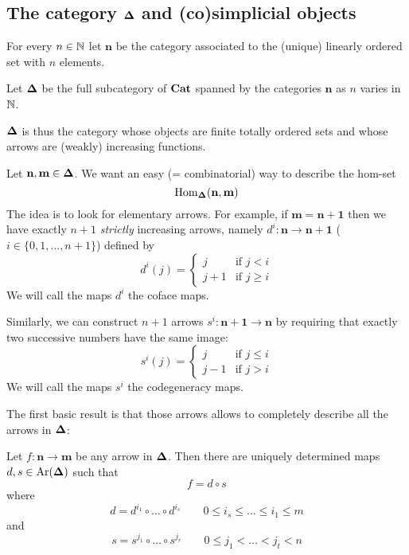 \begin{refsection}
\section{The category $\mathbf \Delta$ and (co)simplicial objects}

\begin{notation}
For every $n \in \mathbb{N}$ let $\mathbf n$ be the category associated to the (unique) linearly ordered set with $n$ elements.
\end{notation}

\begin{defin}
Let $\mathbf \Delta$ be the full subcategory of $\mathbf{Cat}$ spanned by the categories $\mathbf n$ as $n$ varies in $\mathbb{N}$.
\end{defin}

\begin{rmk}
$\mathbf \Delta$ is thus the category whose objects are finite totally ordered sets and whose arrows are (weakly) increasing functions.
\end{rmk}

Let $\mathbf n, \mathbf m \in \mathbf \Delta$. We want an easy (= combinatorial) way to describe the hom-set
\[
\mathrm{Hom}_{\mathbf \Delta}(\mathbf n, \mathbf m)
\]
The idea is to look for elementary arrows. For example, if $\mathbf m = \mathbf{n+1}$ then we have exactly $n+1$ \emph{strictly} increasing arrows, namely $d^i \colon \mathbf n \to \mathbf{n+1}$ ($i \in \{0,1,\ldots,n+1\}$) defined by
\[
d^i(j) = \begin{cases} j & \text{if } j < i \\ j + 1 & \text{if } j \ge i \end{cases}
\]
We will call the maps $d^i$ the coface maps.

Similarly, we can construct $n+1$ arrows $s^i \colon \mathbf{n+1} \to \mathbf n$ by requiring that exactly two successive numbers have the same image:
\[
s^i(j) = \begin{cases} j & \text{if } j \le i \\ j - 1 & \text{if } j > i \end{cases}
\]
We will call the maps $s^i$ the codegeneracy maps.

The first basic result is that those arrows allows to completely describe all the arrows in $\mathbf \Delta$:

\begin{thm} \label{thm factorization epi-mono for Delta}
Let $f \colon \mathbf n \to \mathbf m$ be any arrow in $\mathbf \Delta$. Then there are uniquely determined maps $d,s \in \mathrm{Ar}(\mathbf \Delta)$ such that
\[
f = d \circ s
\]
where
\begin{equation} \label{eq increasing part}
d = d^{i_1} \circ \ldots \circ d^{i_s} \qquad 0 \le i_s \le \ldots \le i_1 \le m
\end{equation}
and
\begin{equation} \label{eq decreasing part}
s = s^{j_1} \circ \ldots \circ s^{j_r} \qquad 0 \le j_1 < \ldots < j_t < n
\end{equation}
\end{thm}


\end{refsection}
